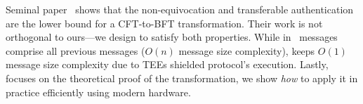 
Seminal paper~\cite{clement2012} shows that the non-equivocation and transferable authentication are the lower bound for a CFT-to-BFT transformation. Their work is not orthogonal to ours---we design \projecttitle{} to satisfy both properties. While in~\cite{clement2012} messages comprise all previous messages ($O(n)$ message size complexity), \projecttitle{} keeps $O(1)$ message size complexity due to TEEs shielded protocol's execution. Lastly, ~\cite{clement2012} focuses on the theoretical proof of the transformation, we show \emph{how} to apply it in practice efficiently using modern hardware.
\fi




